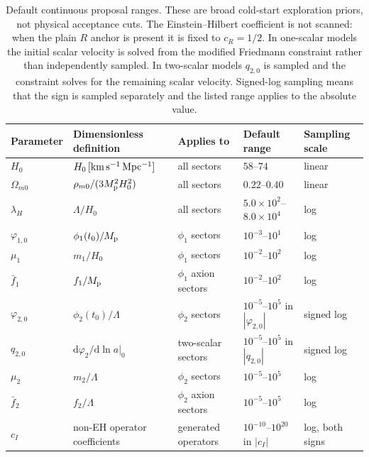 \documentclass[aps,prd,twocolumn,superscriptaddress,nofootinbib,longbibliography]{revtex4-2}
\newcommand{\dd}{\mathrm{d}}
\newcommand{\Mp}{M_{\rm p}}
\newcommand{\Lam}{\Lambda}
\begin{document}
\begin{table}[t]
\centering
\begin{ruledtabular}
\begin{tabular}{lllll}
Parameter & Dimensionless definition & Applies to & Default range & Sampling scale \\
\hline
$H_0$ & $H_0\,[{\rm km\,s^{-1}\,Mpc^{-1}}]$ & all sectors & $58$--$74$ & linear \\
$\Omega_{m0}$ & $\rho_{m0}/(3\Mp^2H_0^2)$ & all sectors & $0.22$--$0.40$ & linear \\
$\lambda_H$ & $\Lam/H_0$ & all sectors & $5.0\times10^2$--$8.0\times10^4$ & log \\
$\varphi_{1,0}$ & $\phi_1(t_0)/\Mp$ & $\phi_1$ sectors & $10^{-3}$--$10^{1}$ & log \\
$\mu_1$ & $m_1/H_0$ & $\phi_1$ sectors & $10^{-2}$--$10^{2}$ & log \\
$\bar f_1$ & $f_1/\Mp$ & $\phi_1$ axion sectors & $10^{-2}$--$10^{2}$ & log \\
$\varphi_{2,0}$ & $\phi_2(t_0)/\Lam$ & $\phi_2$ sectors & $10^{-5}$--$10^{5}$ in $|\varphi_{2,0}|$ & signed log \\
$q_{2,0}$ & $\dd\varphi_2/\dd\ln a|_{0}$ & two-scalar sectors & $10^{-5}$--$10^{5}$ in $|q_{2,0}|$ & signed log \\
$\mu_2$ & $m_2/\Lam$ & $\phi_2$ sectors & $10^{-5}$--$10^{5}$ & log \\
$\bar f_2$ & $f_2/\Lam$ & $\phi_2$ axion sectors & $10^{-5}$--$10^{5}$ & log \\
$c_I$ & non-EH operator coefficients & generated operators & $10^{-10}$--$10^{20}$ in $|c_I|$ & log, both signs \\
\end{tabular}
\end{ruledtabular}
\caption{Default continuous proposal ranges.  These are broad cold-start exploration priors, not physical acceptance cuts.  The Einstein--Hilbert coefficient is not scanned: when the plain $R$ anchor is present it is fixed to $c_R=1/2$.  In one-scalar models the initial scalar velocity is solved from the modified Friedmann constraint rather than independently sampled.  In two-scalar models $q_{2,0}$ is sampled and the constraint solves for the remaining scalar velocity.  Signed-log sampling means that the sign is sampled separately and the listed range applies to the absolute value.}
\label{tab:parameter-priors}
\end{table}
\end{document}
